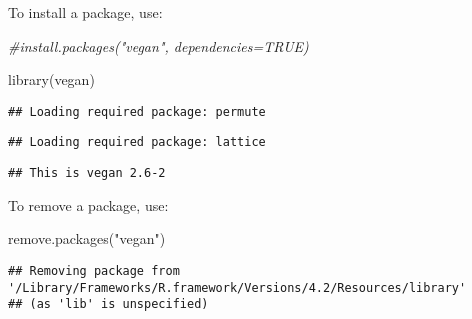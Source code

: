 \documentclass[
]{article}
\newenvironment{Shaded}{\begin{snugshade}}{\end{snugshade}}
\newcommand{\CommentTok}[1]{\textcolor[rgb]{0.56,0.35,0.01}{\textit{#1}}}
\newcommand{\FunctionTok}[1]{\textcolor[rgb]{0.00,0.00,0.00}{#1}}
\newcommand{\NormalTok}[1]{#1}
\newcommand{\StringTok}[1]{\textcolor[rgb]{0.31,0.60,0.02}{#1}}
\begin{document}
To install a package, use:

\begin{Shaded}
\begin{Highlighting}[]
\CommentTok{\#install.packages("vegan", dependencies=TRUE)}
\end{Highlighting}
\end{Shaded}

\begin{Shaded}
\begin{Highlighting}[]
\FunctionTok{library}\NormalTok{(vegan)}
\end{Highlighting}
\end{Shaded}

\begin{verbatim}
## Loading required package: permute
\end{verbatim}

\begin{verbatim}
## Loading required package: lattice
\end{verbatim}

\begin{verbatim}
## This is vegan 2.6-2
\end{verbatim}

To remove a package, use:

\begin{Shaded}
\begin{Highlighting}[]
\FunctionTok{remove.packages}\NormalTok{(}\StringTok{"vegan"}\NormalTok{)}
\end{Highlighting}
\end{Shaded}

\begin{verbatim}
## Removing package from '/Library/Frameworks/R.framework/Versions/4.2/Resources/library'
## (as 'lib' is unspecified)
\end{verbatim}
\end{document}
